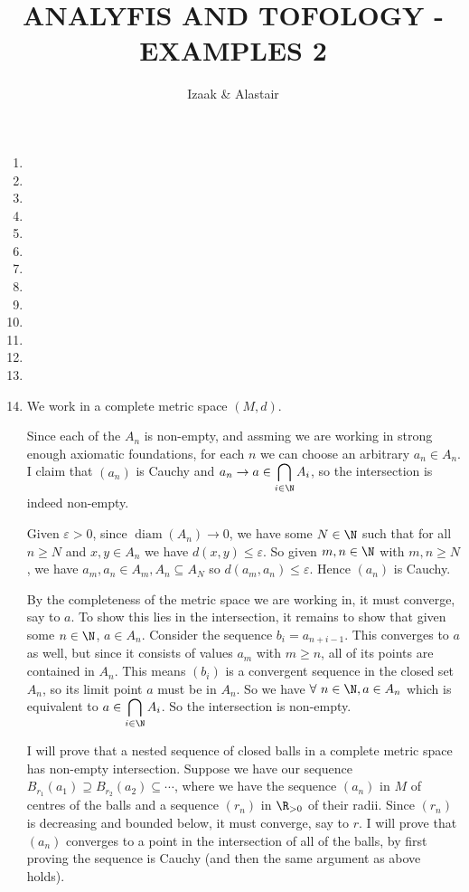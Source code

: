 \documentclass[a4paper,12pt,fleqn]{article}
\author{Izaak \& Alastair}
\title{ANALYFIS AND TOFOLOGY - EXAMPLES 2}
\begin{document}
\maketitle


\begin{enumerate}[label=\arabic*.,leftmargin=*]
 \item
 \item
 \item
 \item
 \item
 \item
 \item
 \item
 \item
 \item
 \item
 \item
 \item
 \item
  We work in a complete metric space \((M, d)\).

  Since each of the \(A_n\) is non-empty, and assming we are working in strong
  enough axiomatic foundations, for each \(n\) we can choose an arbitrary
  \(a_n \in A_n\). I claim that \((a_n)\) is Cauchy and
  \(\displaystyle a_n \to a \in \bigcap_{i \in \N}A_i\), so the
  intersection is indeed non-empty.

  Given \(\varepsilon > 0\), since \(\operatorname{diam}(A_n) \to 0\), we have
  some \(N \in \N\) such that for all \(n \geq N\) and \(x, y \in A_n\) we have
  \(d(x, y) \leq \varepsilon\). So given
  \(m, n \in \N\) with \(m, n \geq N\), we have
  \(a_m, a_n \in A_m, A_n \subseteq A_N\) so
  \(d(a_m, a_n) \leq \varepsilon\). Hence \((a_n)\) is Cauchy.

  By the completeness of the metric space we are working in, it must converge,
  say to \(a\). To show this lies in the intersection, it remains to show that
  given
  some \(n \in \N\), \(a \in A_n\). Consider the sequence \(b_i = a_{n + i - 1}\).
  This converges to \(a\) as well, but since it consists of values \(a_m\) with
  \(m \geq n\), all of its points are contained in \(A_n\). This means \((b_i)\)
  is a convergent sequence in the closed set \(A_n\), so its limit point \(a\)
  must be in \(A_n\). So we have \(\forall\ n \in \N, a \in A_n\) which is
  equivalent to \(\displaystyle a \in \bigcap_{i \in \N}A_i\). So the
  intersection is non-empty.

  I will prove that a nested sequence of closed balls in a complete metric space
  has non-empty intersection. Suppose we have our sequence
  \(B_{r_1}(a_1) \supseteq B_{r_2}(a_2) \subseteq \cdots\), where we have the
  sequence \((a_n)\) in \(M\) of centres of the balls and a sequence \((r_n)\) in
  \(\R_{>0}\) of their radii. Since \((r_n)\) is decreasing and bounded below,
  it must converge, say to \(r\). I will prove that \((a_n)\) converges to a
  point in the intersection of all of the balls, by first proving the sequence
  is Cauchy (and then the same argument as above holds).


\end{enumerate}
\end{document}
